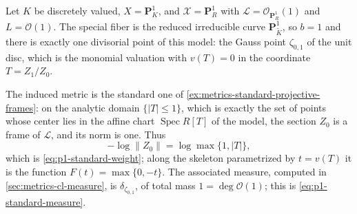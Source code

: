 \begin{example}
\label{ex:metrics-p1-standard-model}
Let $K$ be discretely valued, $X=\mathbf P^1_K$, and
$\mathcal X=\mathbf P^1_R$ with $\mathcal L=\mathcal O_{\mathbf P^1_R}(1)$
and $L=\mathcal O(1)$. The special fiber is the reduced irreducible curve
$\mathbf P^1_{\widetilde K}$, so $b=1$ and there is exactly one
divisorial point of this model: the Gauss point $\zeta_{0,1}$ of the unit
disc, which is the monomial valuation with $v(T)=0$ in the coordinate
$T=Z_1/Z_0$.

The induced metric is the standard one of
\cref{ex:metrics-standard-projective-frames}: on the analytic domain
$\{|T|\le1\}$, which is exactly the set of points whose center lies in the
affine chart $\operatorname{Spec}R[T]$ of the model, the section $Z_0$ is
a frame of $\mathcal L$, and its norm is one. Thus
\[
 -\log\|Z_0\|=\log\max\{1,|T|\},
\]
which is \eqref{eq:p1-standard-weight}; along the skeleton parametrized by
$t=v(T)$ it is the function $F(t)=\max\{0,-t\}$. The associated measure,
computed in \cref{sec:metrics-cl-measure}, is
$\delta_{\zeta_{0,1}}$, of total mass $1=\deg\mathcal O(1)$; this is
\eqref{eq:p1-standard-measure}.
\end{example}

